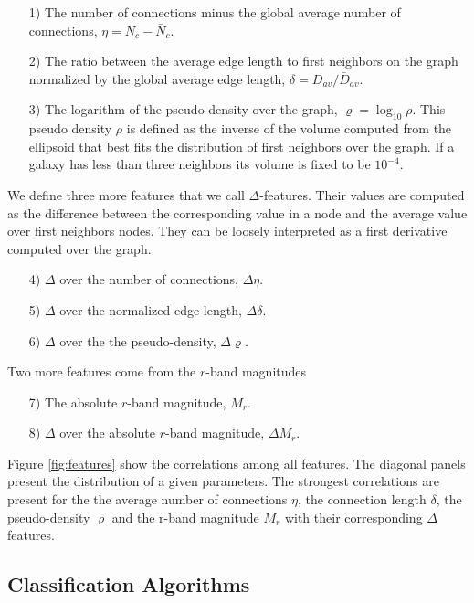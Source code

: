 \documentclass[usenatbib]{mnras}
\begin{document}
\begin{enumerate}
\item[1)]
The number of connections minus the global average number of
connections, $\eta = N_c - \bar{N}_c$. 
\item[2)]
The ratio between the average edge length to first neighbors on the graph
normalized by the global average edge length, $\delta=D_{av}/\bar{D}_{av}$. 
\item[3)] 
The logarithm of the pseudo-density over the graph,
  $\varrho=\log_{10}\rho$.   
This pseudo density $\rho$ is defined as the inverse of the volume
computed from the ellipsoid that best fits the distribution of first
neighbors over the graph. 
If a galaxy has less than three neighbors its volume is fixed to be $10^{-4}$.
\end{enumerate}
\noindent
We define three more features that we call $\Delta$-features.
Their values are computed as the difference between the corresponding
value in a node and the average value over first neighbors nodes.  
They can be loosely interpreted as a first derivative computed over the graph. 

\begin{enumerate}
\item[4)] $\Delta$ over the number of connections, $\Delta\eta$.
\item[5)] $\Delta$ over the normalized edge length, $\Delta\delta$.
\item[6)] $\Delta$ over the the pseudo-density, $\Delta\varrho$.
\end{enumerate}

\noindent
Two more features come from the $r$-band magnitudes
\begin{enumerate}
\item[7)] The absolute $r$-band magnitude, $M_r$.
\item[8)] $\Delta$ over the absolute $r$-band magnitude, $\Delta M_r$.
\end{enumerate}

Figure \ref{fig:features} show the correlations among all features.
The diagonal panels present the distribution of a given parameters.
The strongest correlations are present for the the average number of
connections $\eta$, the connection length $\delta$, the
pseudo-density $\varrho$ and the r-band magnitude $M_r$ with their
corresponding $\Delta$ features.





\subsection{Classification Algorithms}
\end{document}
